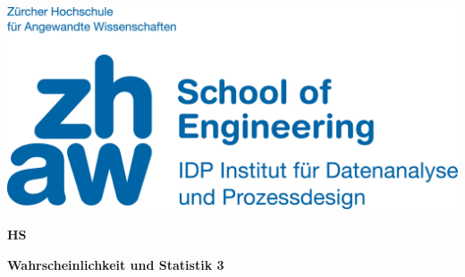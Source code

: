 \noindent
\begin{minipage}[t]{0.4\textwidth} 
\includegraphics[width=\linewidth]{logo.jpg}
\end{minipage}%
\hfill%
\begin{minipage}[t]{0.4\textwidth}\raggedleft
\textbf{\large HS \the\year}
\end{minipage}

\begin{center}
 \textbf{\large Wahrscheinlichkeit und Statistik 3} \\
 \vspace{0.3cm}
\end{center}

